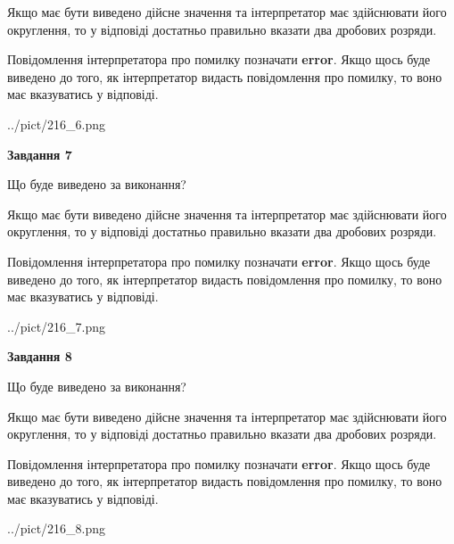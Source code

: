 \documentclass[12pt, ukrainian]{article}
\begin{document}
{\begin {Large}
Якщо має бути виведено дійсне значення та інтерпретатор має здійснювати його округлення, 
то у відповіді достатньо правильно вказати два дробових розряди.

Повідомлення інтерпретатора про помилку позначати \textbf{error}.
Якщо щось буде виведено до того, як інтерпретатор видасть повідомлення про помилку, 
то воно має вказуватись у відповіді. \par

\begin{center}
	{../pict/216_6.png}
\end{center}
\newpage

{\begin {center}\textbf{Завдання 7}\end {center}}\par
Що буде виведено за виконання? \par

Якщо має бути виведено дійсне значення та інтерпретатор має здійснювати його округлення, 
то у відповіді достатньо правильно вказати два дробових розряди.

Повідомлення інтерпретатора про помилку позначати \textbf{error}.
Якщо щось буде виведено до того, як інтерпретатор видасть повідомлення про помилку, 
то воно має вказуватись у відповіді. \par

\begin{center}
	{../pict/216_7.png}
\end{center}
\newpage

{\begin {center}\textbf{Завдання 8}\end {center}}\par
Що буде виведено за виконання? \par

Якщо має бути виведено дійсне значення та інтерпретатор має здійснювати його округлення, 
то у відповіді достатньо правильно вказати два дробових розряди.

Повідомлення інтерпретатора про помилку позначати \textbf{error}.
Якщо щось буде виведено до того, як інтерпретатор видасть повідомлення про помилку, 
то воно має вказуватись у відповіді. \par

\begin{center}
	{../pict/216_8.png}
\end{center}
\newpage


\end{Large}}
\end{document}
